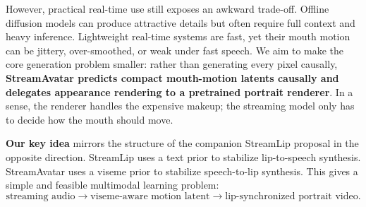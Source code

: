 \documentclass{article}
\begin{document}
However, practical real-time use still exposes an awkward trade-off. Offline diffusion models can produce attractive details but often require full context and heavy inference. Lightweight real-time systems are fast, yet their mouth motion can be jittery, over-smoothed, or weak under fast speech. We aim to make the core generation problem smaller: rather than generating every pixel causally, \textbf{StreamAvatar predicts compact mouth-motion latents causally and delegates appearance rendering to a pretrained portrait renderer}. In a sense, the renderer handles the expensive makeup; the streaming model only has to decide how the mouth should move.

\textbf{Our key idea} mirrors the structure of the companion StreamLip proposal in the opposite direction. StreamLip uses a text prior to stabilize lip-to-speech synthesis. StreamAvatar uses a viseme prior to stabilize speech-to-lip synthesis. This gives a simple and feasible multimodal learning problem:
\[
    \text{streaming audio} \rightarrow \text{viseme-aware motion latent} \rightarrow \text{lip-synchronized portrait video}.
\]
\end{document}
